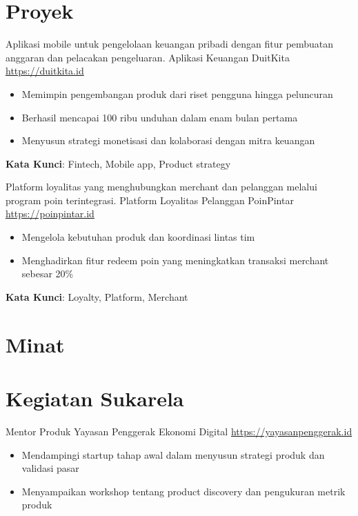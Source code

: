 \documentclass[a4paper, serif, 10pt]{moderncv}
\begin{document}
\section{Proyek}

        {Aplikasi mobile untuk pengelolaan keuangan pribadi dengan fitur pembuatan anggaran dan pelacakan pengeluaran.}
        {Aplikasi Keuangan DuitKita}
        {\url{https://duitkita.id}}
        {}
        {\begin{itemize}
\item Memimpin pengembangan produk dari riset pengguna hingga peluncuran
\item Berhasil mencapai 100 ribu unduhan dalam enam bulan pertama
\item Menyusun strategi monetisasi dan kolaborasi dengan mitra keuangan
\end{itemize}
\textbf{Kata Kunci}: Fintech, Mobile app, Product strategy}

        {Platform loyalitas yang menghubungkan merchant dan pelanggan melalui program poin terintegrasi.}
        {Platform Loyalitas Pelanggan PoinPintar}
        {\url{https://poinpintar.id}}
        {}
        {\begin{itemize}
\item Mengelola kebutuhan produk dan koordinasi lintas tim
\item Menghadirkan fitur redeem poin yang meningkatkan transaksi merchant sebesar 20\%
\end{itemize}
\textbf{Kata Kunci}: Loyalty, Platform, Merchant}
\section{Minat}

\section{Kegiatan Sukarela}

        {Mentor Produk}
        {Yayasan Penggerak Ekonomi Digital}
        {\url{https://yayasanpenggerak.id}}
        {}
        {\begin{itemize}
\item Mendampingi startup tahap awal dalam menyusun strategi produk dan validasi pasar
\item Menyampaikan workshop tentang product discovery dan pengukuran metrik produk
\end{itemize}}
    
\end{document}
